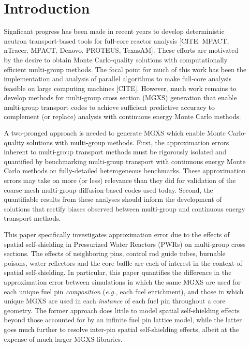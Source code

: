\section{Introduction}
\label{sec:intro}

Signficant progress has been made in recent years to develop deterministic neutron transport-based tools for full-core reactor analysis [CITE: MPACT, nTracer, MPACT, Denovo, PROTEUS, TexasAM]. These efforts are motivated by the desire to obtain Monte Carlo-quality solutions with computationally efficient multi-group methods. The focal point for much of this work has been the implementation and analysis of parallel algorithms to make full-core analysis feasible on large computing machines [CITE]. However, much work remains to develop methods for multi-group cross section (MGXS) generation that enable multi-group transport codes to achieve sufficient predictive accuracy to complement (or replace) analysis with continuous energy Monte Carlo methods.

A two-pronged approach is needed to generate MGXS which enable Monte Carlo-quality solutions with multi-group methods. First, the approximation errors inherent to multi-group transport methods must be rigorously isolated and quantified by benchmarking multi-group transport with continuous energy Monte Carlo methods on fully-detailed heterogeneous benchmarks. These approximation errors may take on more (or less) relevance than they did for validation of the coarse-mesh multi-group diffusion-based codes used today. Second, the quantifiable results from these analyses should inform the development of solutions that rectify biases observed between multi-group and continuous energy transport methods.

This paper specifically investigates approximation error due to the effects of spatial self-shielding in Pressurized Water Reactors (PWRs) on multi-group cross sections. The effects of neighboring pins, control rod guide tubes, burnable poisons, water reflectors and the core baffle are each of interest in the context of spatial self-shielding. In particular, this paper quantifies the difference in the approximation error between simulations in which the same MGXS are used for each unique fuel pin \textit{composition} (\textit{e.g.}, each fuel enrichment), and those in which unique MGXS are used in each \textit{instance} of each fuel pin throughout a core geometry. The former approach does little to model spatial self-shielding effects beyond those accounted for by an infinite fuel pin lattice model, while the latter goes much further to resolve inter-pin spatial self-shielding effects, albeit at the expense of much larger MGXS libraries.

